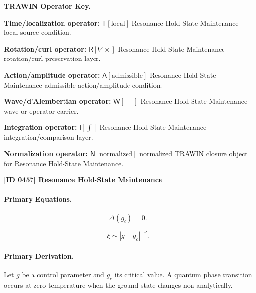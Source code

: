 \par\vspace{0.45\baselineskip}
\noindent\begin{minipage}[t]{\linewidth}
\begingroup
\small
\raggedright
\textbf{TRAWIN Operator Key.}\par
\noindent\textbf{Time/localization operator:} $\mathsf{T}\!\left[\mathrm{local}\right]$ Resonance Hold-State Maintenance local source condition.\par
\noindent\textbf{Rotation/curl operator:} $\mathsf{R}\!\left[\nabla\times\right]$ Resonance Hold-State Maintenance rotation/curl preservation layer.\par
\noindent\textbf{Action/amplitude operator:} $\mathsf{A}\!\left[\mathrm{admissible}\right]$ Resonance Hold-State Maintenance admissible action/amplitude condition.\par
\noindent\textbf{Wave/d'Alembertian operator:} $\mathsf{W}\!\left[\Box\right]$ Resonance Hold-State Maintenance wave or operator carrier.\par
\noindent\textbf{Integration operator:} $\mathsf{I}\!\left[\int\right]$ Resonance Hold-State Maintenance integration/comparison layer.\par
\noindent\textbf{Normalization operator:} $\mathsf{N}\!\left[\mathrm{normalized}\right]$ normalized TRAWIN closure object for Resonance Hold-State Maintenance.\par
\endgroup
\end{minipage}

\clearpage
\noindent\textbf{[ID 0457] Resonance Hold-State Maintenance}\par
\vspace{0.35em}
\begingroup\small
\paragraph{Primary Equations.}
\begin{equation}
\Delta(g_c)=0 .
\end{equation}

\begin{equation}
\xi \sim |g-g_c|^{-\nu}.
\end{equation}

\paragraph{Primary Derivation.}
Let $g$ be a control parameter and $g_c$ its critical value.  
A quantum phase transition occurs at zero temperature when the ground state changes non-analytically.

